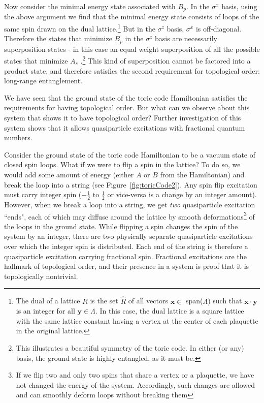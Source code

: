 Now consider the minimal energy state associated with $B_{p}$. In the $\sigma^{x}$ basis, using the above argument we find that the minimal energy state consists of loops of the same spin drawn on the dual lattice.\footnote{The dual of a lattice $R$ is the set $\hat{R}$ of all vectors $\mathbf{x} \in$ span($\Lambda$) such that $\mathbf{x} \cdot \mathbf{y}$ is an integer for all $\mathbf{y} \in \Lambda$. In this case, the dual lattice is a square lattice with the same lattice constant having a vertex at the center of each plaquette in the original lattice.} But in the $\sigma^{z}$ basis, $\sigma^{x}$ is off-diagonal. Therefore the states that minimize $B_{p}$ in the $\sigma^{z}$ basis are necessarily superposition states - in this case an equal weight superposition of all the possible states that minimize $A_{s}$ \cite{Savary2017}.\footnote{This illustrates a beautiful symmetry of the toric code. In either (or any) basis, the ground state is highly entangled, as it must be.} This kind of superposition cannot be factored into a product state, and therefore satisfies the second requirement for topological order: long-range entanglement.

We have seen that the ground state of the toric code Hamiltonian satisfies the requirements for having topological order. But what can we observe about this system that shows it to have topological order? Further investigation of this system shows that it allows quasiparticle excitations with fractional quantum numbers.

Consider the ground state of the toric code Hamiltonian to be a vacuum state of closed spin loops. What if we were to flip a spin in the lattice? To do so, we would add some amount of energy (either $A$ or $B$ from the Hamiltonian) and break the loop into a string (see Figure~\ref{fig:toricCode2}). Any spin flip excitation must carry integer spin ($-\frac{1}{2}$ to $\frac{1}{2}$ or vice-versa is a change by an integer amount). However, when we break a loop into a string, we get \textit{two} quasiparticle excitation ``ends", each of which may diffuse around the lattice by smooth deformations\footnote{If we flip two and only two spins that share a vertex or a plaquette, we have not changed the energy of the system. Accordingly, such changes are allowed and can smoothly deform loops without breaking them} of the loops in the ground state. While flipping a spin changes the spin of the system by an integer, there are two physically separate quasiparticle excitations over which the integer spin is distributed. Each end of the string is therefore a quasiparticle excitation carrying fractional spin. Fractional excitations are the hallmark of topological order, and their presence in a system is proof that it is topologically nontrivial.

